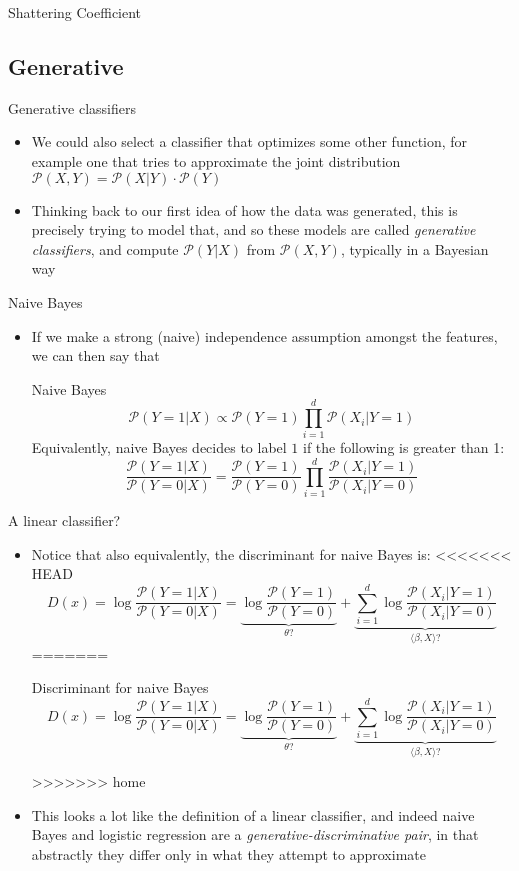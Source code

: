 \documentclass{beamer}
\renewcommand{\Pr}[1]{\mathcal{P} \left( #1 \right)}
\newcommand{\an}[1]{\langle #1 \rangle}
\begin{document}
\begin{frame}{Shattering Coefficient}
\subsection{Generative}
\begin{frame}{Generative classifiers}
\begin{itemize}
\item We could also select a classifier that optimizes some other function, for example one that tries to approximate the joint distribution $\Pr{X,Y} = \Pr{X|Y} \cdot \Pr{Y}$
\item Thinking back to our first idea of how the data was generated, this is precisely trying to model that, and so these models are called \emph{generative classifiers}, and compute $\Pr{Y|X}$ from $\Pr{X,Y}$, typically in a Bayesian way
\end{itemize}
\end{frame}

\begin{frame}{Naive Bayes}
\begin{itemize}
\item If we make a strong (naive) independence assumption amongst the features, we can then say that
\begin{block}{Naive Bayes}
\[ \Pr{Y=1|X} \propto \Pr{Y=1} \prod_{i=1}^d \Pr{X_i | Y=1} \]
Equivalently, naive Bayes decides to label $1$ if the following is greater than 1:
\[ \frac{\Pr{Y=1|X}}{\Pr{Y=0|X}} = \frac{\Pr{Y=1}}{\Pr{Y=0}} \prod_{i=1}^d \frac{\Pr{X_i|Y=1}}{\Pr{X_i|Y=0}} \]
\end{block}
\end{itemize}
\end{frame}

\begin{frame}{A linear classifier?}
\begin{itemize}
\item Notice that also equivalently, the discriminant for naive Bayes is:
<<<<<<< HEAD
\[ D(x) = \log \frac{\Pr{Y=1|X}}{\Pr{Y=0|X}} = \underbrace{\log\frac{\Pr{Y=1}}{\Pr{Y=0}}}_{\theta?} +  \underbrace{\sum_{i=1}^d \log \frac{\Pr{X_i|Y=1}}{\Pr{X_i|Y=0}}}_{\an{\beta,X}?} \]
=======
\begin{block}{Discriminant for naive Bayes}
\[ D(x) = \log \frac{\Pr{Y=1|X}}{\Pr{Y=0|X}} = \underbrace{\log\frac{\Pr{Y=1}}{\Pr{Y=0}}}_{\theta?} +  \underbrace{\sum_{i=1}^d \log \frac{\Pr{X_i|Y=1}}{\Pr{X_i|Y=0}}}_{\an{\beta,X}?} \]
\end{block}
>>>>>>> home
\item This looks a lot like the definition of a linear classifier, and indeed naive Bayes and logistic regression are a \emph{generative-discriminative pair}, in that abstractly they differ only in what they attempt to approximate
\end{itemize}
\end{frame}


\end{frame}
\end{document}
